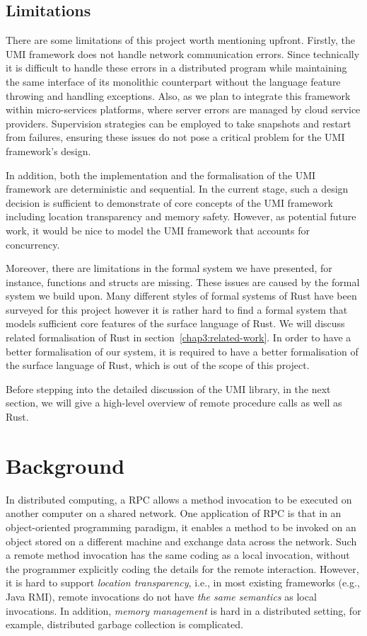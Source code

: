 \subsection{Limitations}
There are some limitations of this project worth mentioning upfront. Firstly, the UMI framework does not handle network communication errors. Since technically it is difficult to handle these errors in a distributed program while maintaining the same interface of its monolithic counterpart without the language feature throwing and handling exceptions. Also, as we plan to integrate this framework within micro-services platforms, where server errors are managed by cloud service providers. Supervision strategies can be employed to take snapshots and restart from failures, ensuring these issues do not pose a critical problem for the UMI framework's design. 

In addition, both the implementation and the formalisation of the UMI framework are deterministic and sequential. In the current stage, such a design decision is sufficient to demonstrate of core concepts of the UMI framework including location transparency and memory safety. However, as potential future work, it would be nice to model the UMI framework that accounts for concurrency.

Moreover, there are limitations in the formal system we have presented, for instance, functions and structs are missing. These issues are caused by the formal system we build upon. Many different styles of formal systems of Rust have been surveyed for this project however it is rather hard to find a formal system that models sufficient core features of the surface language of Rust. We will discuss related formalisation of Rust in section~\ref{chap3:related-work}. In order to have a better formalisation of our system, it is required to have a better formalisation of the surface language of Rust, which is out of the scope of this project.

Before stepping into the detailed discussion of the UMI library, in the next section, we will give a high-level overview of remote procedure calls as well as Rust.

\section{Background}
\label{chap3:background}
In distributed computing, a RPC allows a method invocation to be executed on another computer on a shared network. One application of RPC is that in an object-oriented programming paradigm, it enables a method to be invoked on an object stored on a different machine and exchange data across the network. Such a remote method invocation has the same coding as a local invocation, without the programmer explicitly coding the details for the remote interaction.
However, it is hard to support \emph{location transparency}, i.e., in most existing frameworks (e.g., Java RMI), remote invocations do not have \emph{the same semantics} as local invocations. In addition, \emph{memory management} is hard in a distributed setting, for example, distributed garbage collection is complicated.

